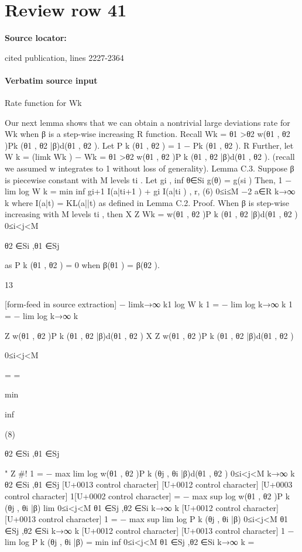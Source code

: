 \documentclass[10pt]{article}
\begin{document}
\section*{Review row 41}
\textbf{Source locator:} {\footnotesize\raggedright cited publication, lines 2227-\allowbreak{}2364\par}
\paragraph{Verbatim source input}
\begin{ReviewVerbatim}
Rate function for Wk

Our next lemma shows that we can obtain a nontrivial large deviations rate for Wk when β is a
step-wise increasing
R function.
Recall Wk = θ1 >θ2 w(θ1 , θ2 )Pk (θ1 , θ2 |β)d(θ1 , θ2 ).
Let P k (θ1 , θ2 ) = 1 − Pk (θ1 , θ2 ).
R
Further, let W k = (limk Wk ) − Wk = θ1 >θ2 w(θ1 , θ2 )P k (θ1 , θ2 |β)d(θ1 , θ2 ). (recall we assumed
w integrates to 1 without loss of generality).
Lemma C.3. Suppose β is piecewise constant with M levels {ti }. Let gi , inf θ∈Si g(θ) = g(si )
Then,
1
− lim log W k = min inf {gi+1 I(a|ti+1 ) + gi I(a|ti )} , r,
(6)
0≤i≤M −2 a∈R
k→∞ k
where I(a|t) = KL(a||t) as defined in Lemma C.2.
Proof. When β is step-wise increasing with M levels {ti }, then
X Z
Wk =
w(θ1 , θ2 )P k (θ1 , θ2 |β)d(θ1 , θ2 )
0≤i<j<M

θ2 ∈Si ,θ1 ∈Sj

as P k (θ1 , θ2 ) = 0 when β(θ1 ) = β(θ2 ).

13


[form-feed in source extraction]
− limk→∞ k1 log W k
1
= − lim log
k→∞ k
1
= − lim log
k→∞ k

Z
w(θ1 , θ2 )P k (θ1 , θ2 |β)d(θ1 , θ2 )
X Z
w(θ1 , θ2 )P k (θ1 , θ2 |β)d(θ1 , θ2 )

0≤i<j<M

=
=

min

inf

(8)

θ2 ∈Si ,θ1 ∈Sj

" Z
#!
1
= − max
lim
log
w(θ1 , θ2 )P k (θj , θi |β)d(θ1 , θ2 )
0≤i<j<M k→∞ k
θ2 ∈Si ,θ1 ∈Sj
[U+0013 control character]
[U+0012 control character]
[U+0003 control character]
1[U+0002 control character]
= − max
sup
log w(θ1 , θ2 )P k (θj , θi |β)
lim
0≤i<j<M θ1 ∈Sj ,θ2 ∈Si k→∞ k
[U+0012 control character]
[U+0013 control character]
1
= − max
sup
lim log P k (θj , θi |β)
0≤i<j<M θ1 ∈Sj ,θ2 ∈Si k→∞ k
[U+0012 control character]
[U+0013 control character]
1
− lim log P k (θj , θi |β)
= min
inf
0≤i<j<M θ1 ∈Sj ,θ2 ∈Si
k→∞ k
=


\end{ReviewVerbatim}
\end{document}
